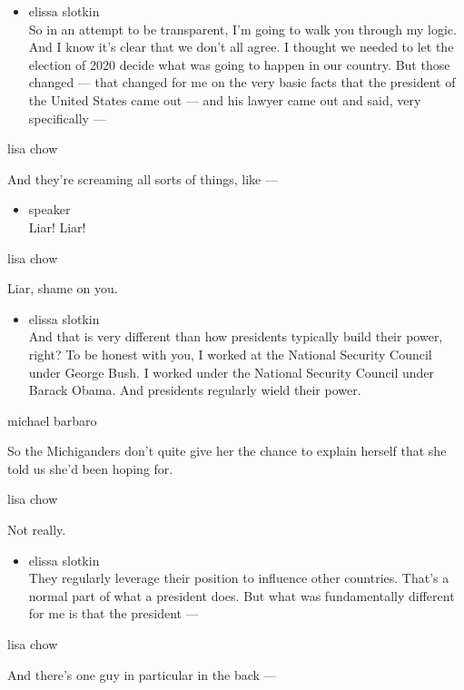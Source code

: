 \begin{itemize}
\tightlist
\item
  elissa slotkin\\
  So in an attempt to be transparent, I'm going to walk you through my
  logic. And I know it's clear that we don't all agree. I thought we
  needed to let the election of 2020 decide what was going to happen in
  our country. But those changed --- that changed for me on the very
  basic facts that the president of the United States came out --- and
  his lawyer came out and said, very specifically ---
\end{itemize}

lisa chow

And they're screaming all sorts of things, like ---

\begin{itemize}
\tightlist
\item
  speaker\\
  Liar! Liar!
\end{itemize}

lisa chow

Liar, shame on you.

\begin{itemize}
\tightlist
\item
  elissa slotkin\\
  And that is very different than how presidents typically build their
  power, right? To be honest with you, I worked at the National Security
  Council under George Bush. I worked under the National Security
  Council under Barack Obama. And presidents regularly wield their
  power.
\end{itemize}

michael barbaro

So the Michiganders don't quite give her the chance to explain herself
that she told us she'd been hoping for.

lisa chow

Not really.

\begin{itemize}
\tightlist
\item
  elissa slotkin\\
  They regularly leverage their position to influence other countries.
  That's a normal part of what a president does. But what was
  fundamentally different for me is that the president ---
\end{itemize}

lisa chow

And there's one guy in particular in the back ---

